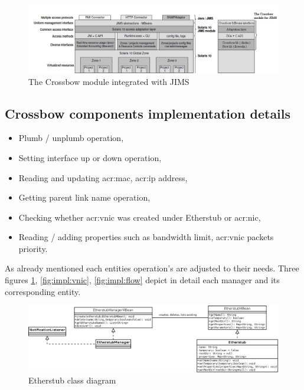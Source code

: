 \documentclass[11pt,openany]{book}
\begin{document}
      \begin{figure}[H]
        \centering
        \includegraphics[width=1.26\textwidth, angle=90]{img/impl/jims_and_cm4j.png}

        \caption{The Crossbow module integrated with JIMS \cite{jims}}
      \end{figure}
		

      \subsection{Crossbow components implementation details}
      \label{sec:impl:comp}

        \begin{itemize}
          \item Plumb / unplumb operation, 
          \item Setting interface up or down operation,
          \item Reading and updating \gls{acr:mac}, \gls{acr:ip} address,
          \item Getting parent link name operation,
          \item Checking whether \gls{acr:vnic} was created under Etherstub or \gls{acr:nic},
          \item Reading / adding properties such as bandwidth limit, \gls{acr:vnic} packets priority.
        \end{itemize}

        As already mentioned each entities operation's are adjusted to their needs. Three figures \ref{fig:impl:etherstub}, 
        \ref{fig:impl:vnic}, \ref{fig:impl:flow} depict in detail each manager and its corresponding entity.

        \begin{figure}[H]
          \centering
          \includegraphics[width=1.2\textwidth, angle=90]{img/impl/etherstub.png}

          \caption{Etherstub class diagram}
          \label{fig:impl:etherstub}
        \end{figure}
\end{document}
